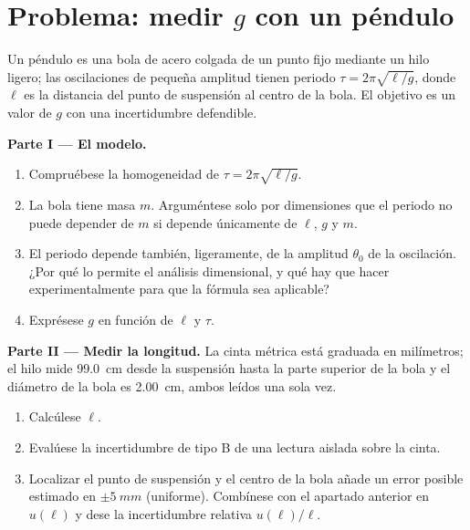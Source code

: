 \section{Problema: medir $g$ con un péndulo}

\begin{problem}
\label{pb:b1:units-dimensions:1}
Un péndulo es una bola de acero colgada de un punto fijo mediante un hilo
ligero; las oscilaciones de pequeña amplitud tienen periodo
$\tau = 2\pi\sqrt{\ell/g}$, donde $\ell$ es la distancia del punto de
suspensión al centro de la bola. El objetivo es un valor de $g$ con una
incertidumbre defendible.

\medskip
\noindent\textbf{Parte I --- El modelo.}
\begin{enumerate}
  \item Compruébese la homogeneidad de $\tau = 2\pi\sqrt{\ell/g}$.
  \item La bola tiene masa $m$. Arguméntese solo por dimensiones que el
        periodo no puede depender de $m$ si depende únicamente de $\ell$,
        $g$ y $m$.
  \item El periodo depende también, ligeramente, de la amplitud
        $\theta_0$ de la oscilación. ¿Por qué lo permite el análisis
        dimensional, y qué hay que hacer experimentalmente para que la
        fórmula sea aplicable?
  \item Exprésese $g$ en función de $\ell$ y $\tau$.
\end{enumerate}

\medskip
\noindent\textbf{Parte II --- Medir la longitud.}
La cinta métrica está graduada en milímetros; el hilo mide
\qty{99.0}{cm} desde la suspensión hasta la parte superior de la bola y el
diámetro de la bola es \qty{2.00}{cm}, ambos leídos una sola vez.
\begin{enumerate}[resume]
  \item Calcúlese $\ell$.
  \item Evalúese la incertidumbre de tipo B de una lectura aislada sobre
        la cinta.
  \item Localizar el punto de suspensión y el centro de la bola añade un
        error posible estimado en $\pm\qty{5}{mm}$ (uniforme). Combínese
        con el apartado anterior en $u(\ell)$ y dese la incertidumbre
        relativa $u(\ell)/\ell$.
\end{enumerate}


\end{problem}
